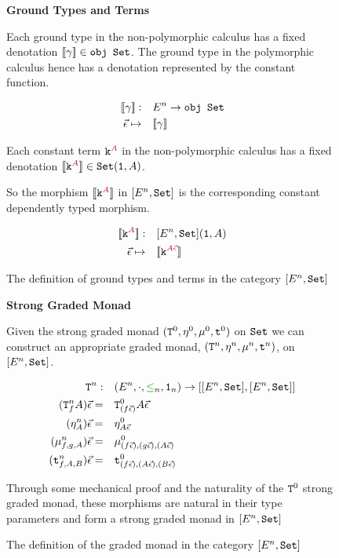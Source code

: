 \documentclass{Report}
\begin{document}
\begin{figure}
    \begin{framed}
        \centering\textbf{Ground Types and Terms}

        Each ground type in the non-polymorphic calculus has a fixed denotation ${\bf [\![}\gamma{\bf ]\!]}\in\texttt{obj }\texttt{Set}$. The ground type in the polymorphic calculus hence has a denotation represented by the constant function.
        
        \begin{align*}
            {\bf [\![}\gamma{\bf ]\!]}:&\quad E^n\rightarrow \texttt{obj }\texttt{Set}\\
            \vec{\epsilon} \mapsto&\quad  {\bf [\![}\gamma{\bf ]\!]}\\
        \end{align*}
        
        Each constant term $\texttt{k}^{\color{purple} A}$ in the non-polymorphic calculus has a fixed denotation ${\bf [\![}\texttt{k}^{\color{purple} A}{\bf ]\!]}\in\texttt{Set}(\texttt{1}, A)$.
        
        So the morphism ${\bf [\![}\texttt{k}^{\color{purple} A}{\bf ]\!]}$ in $[E^n, \texttt{Set}]$ is the corresponding constant dependently typed morphism.
        
        \begin{align*}
            {\bf [\![}\texttt{k}^{\color{purple} A}{\bf ]\!]}:&\quad[E^n, \texttt{Set}](\texttt{1}, A)\\
            \vec{\epsilon}\mapsto&\quad{\bf [\![}\texttt{k}^{\color{purple} A\vec{\epsilon}}{\bf ]\!]}
        \end{align*}        
    \end{framed}
    \caption{The definition of ground types and terms in the category $[E^n, \texttt{Set}]$ }
    \label{HowToBuildGround}
\end{figure}


\begin{figure}
    \begin{framed}
        \centering\textbf{Strong Graded Monad}

Given the strong graded monad $(\texttt{T}^0_{}, \eta_{}^0, \mu^0, \texttt{t}^0)$ on $\texttt{Set}$ we can construct an appropriate graded monad, $(\texttt{T}^n_{}, \eta_{}^n{}{}, \mu^n,\texttt{t}^n)$, on $[E^n, \texttt{Set}]$.

\begin{align*}
    \Tn{}{}:&\quad(E^n, \dot, \subeffect_n, \1_n) \rightarrow [[E^n, \set], [E^n, \set]]\\
    (\Tn{f}{A})\ev=&\quad \Tz{(f\ev)}{A\ev}\\
    (\pointn{A})\ev=&\quad\pointz{A\ev}\\
    (\bindn{f}{g}{A})\ev=&\quad\bindz{(f\ev)}{(g\ev)}{(A\ev)}\\
    (\tstrengthn{f}{A}{B})\ev=&\quad\tstrengthz{(f\ev)}{(A\ev)}{(B\ev)}
\end{align*}

Through some mechanical proof and the naturality of the $\texttt{T}^0_{}$ strong graded monad, these morphisms are natural in their type parameters and form a strong graded monad in $[E^n, \texttt{Set}]$

    \end{framed}
    \caption{The definition of the graded monad in the category $[E^n, \texttt{Set}]$}
    \label{HowToBuildMonad}
\end{figure}
\end{document}
